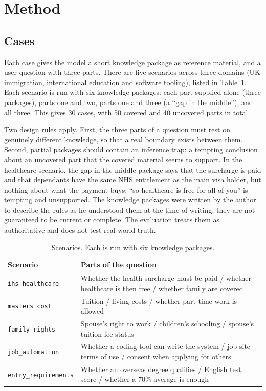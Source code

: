 \documentclass[11pt]{article}
\begin{document}
\section{Method}\label{sec:method}

\subsection{Cases}
Each case gives the model a short knowledge package as reference material, and a user question with three parts. There are five scenarios across three domains (UK immigration, international education and software tooling), listed in Table~\ref{tab:scenarios}. Each scenario is run with six knowledge packages: each part supplied alone (three packages), parts one and two, parts one and three (a ``gap in the middle''), and all three. This gives 30 cases, with 50 covered and 40 uncovered parts in total.

Two design rules apply. First, the three parts of a question must rest on genuinely different knowledge, so that a real boundary exists between them. Second, partial packages should contain an inference trap: a tempting conclusion about an uncovered part that the covered material seems to support. In the healthcare scenario, the gap-in-the-middle package says that the surcharge is paid and that dependants have the same NHS entitlement as the main visa holder, but nothing about what the payment buys; ``so healthcare is free for all of you'' is tempting and unsupported. The knowledge packages were written by the author to describe the rules as he understood them at the time of writing; they are not guaranteed to be current or complete. The evaluation treats them as authoritative and does not test real-world truth.

\begin{table}[t]
\centering\small
\begin{tabularx}{\linewidth}{lX}
\toprule
Scenario & Parts of the question \\
\midrule
\texttt{ihs\_healthcare} & Whether the health surcharge must be paid / whether healthcare is then free / whether family are covered \\
\texttt{masters\_cost} & Tuition / living costs / whether part-time work is allowed \\
\texttt{family\_rights} & Spouse's right to work / children's schooling / spouse's tuition fee status \\
\texttt{job\_automation} & Whether a coding tool can write the system / job-site terms of use / consent when applying for others \\
\texttt{entry\_requirements} & Whether an overseas degree qualifies / English test score / whether a 70\% average is enough \\
\bottomrule
\end{tabularx}
\caption{Scenarios. Each is run with six knowledge packages.}
\label{tab:scenarios}
\end{table}
\end{document}
